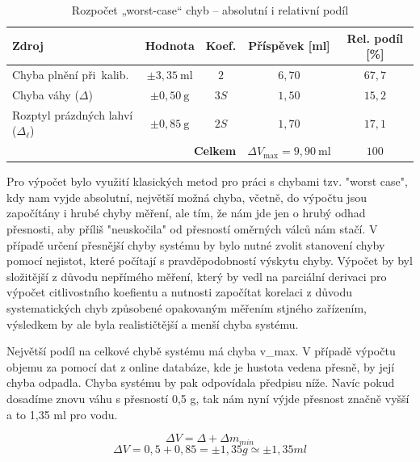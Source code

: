 \begin{table}[h]
\centering
\caption{Rozpočet „worst-case“ chyb – absolutní i relativní podíl}
\renewcommand{\arraystretch}{1.15}
\begin{tabular}{@{}lcccc@{}}
\toprule
\textbf{Zdroj} & \textbf{Hodnota} & \textbf{Koef.} & \textbf{Příspěvek [ml]} & \textbf{Rel. podíl [\%]}\\
\midrule
Chyba plnění při~kalib.        & $\pm3{,}35\ \mathrm{ml}$ & $2$ & $6{,}70$ & $67{,}7$\\
Chyba váhy (\(\Delta\))        & $\pm0{,}50\ \mathrm{g}$ & $3S$ & $1{,}50$ & $15{,}2$\\
Rozptyl prázdných lahví (\(\Delta_\ell\))
                               & $\pm0{,}85\ \mathrm{g}$ & $2S$ & $1{,}70$ & $17{,}1$\\
\midrule
\multicolumn{3}{r}{\textbf{Celkem}} &
\(\boxed{\Delta V_{\text{max}} = 9{,}90\ \mathrm{ml}}\) & $100$\\
\bottomrule
\end{tabular}
\label{tab:worst_case_budget_rel}
\end{table}


Pro výpočet bylo využití klasických metod pro práci s chybami tzv. "worst case", kdy nam vyjde absolutní, největší možná chyba, včetně, do výpočtu jsou započítány i hrubé chyby měření, ale tím, že nám jde jen o hrubý odhad přesnosti, aby příliš "neuskočila" od přesností oměrných válců nám stačí. V případě určení přesnější chyby systému by bylo nutné zvolit stanovení chyby pomocí nejistot, které počítají s pravděpodobností výskytu chyby. Výpočet by byl složitější z důvodu nepřímého měření, který by vedl na parciální derivaci pro výpočet citlivostního koefientu a nutnosti započítat korelaci z důvodu systematických chyb způsobené opakovaným měřením stjného zařízením, výsledkem by ale byla realističtější a menší chyba systému.

Největší podíl na celkové chybě systému má chyba v\_max. V případě výpočtu objemu za pomocí dat z online databáze, kde je hustota vedena přesně, by její chyba odpadla. Chyba systému by pak odpovídala předpisu níže. Navíc pokud dosadíme znovu váhu s přesností 0,5 g, tak nám nyní výjde přesnost značně vyšší a to 1,35 ml pro vodu.

\[\Delta V = \Delta + \Delta m_{min}\]
\[\Delta V = 0,5 + 0,85 = \pm 1,35 g \simeq \pm 1,35 ml\]




